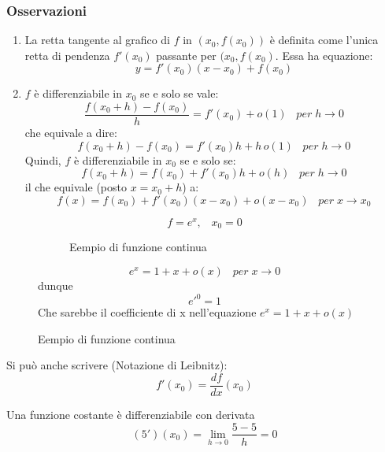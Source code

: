 \documentclass[a4paper]{article}
\theoremstyle{break}
\theoremstyle{break}
\theoremstyle{break}
\theoremstyle{break}
\begin{document}
\subsubsection{Osservazioni}
\begin{enumerate}
  \item La retta tangente al grafico di \( f \) in \( (x_0, f(x_0)) \) è definita
    come l'unica retta di pendenza \( f'(x_0) \) passante per \( (x_0, f(x_0) \).
    Essa ha equazione:
    \[
      y = f'(x_0)(x-x_0) + f(x_0)
    \]
  \item \( f \) è differenziabile in \( x_0 \) se e solo se vale:
    \[
      \frac{f(x_0+h)-f(x_0)}{h}=f'(x_0) + o(1)\;\;\; per\;h \to 0
    \]
    che equivale a dire:
    \[
      f(x_0+h)-f(x_0)=f'(x_0)h+h\,o(1)\;\;\; per\;h \to 0
    \]
    Quindi, \( f \) è differenziabile in \( x_0 \) se e solo se:
    \[
      f(x_0+h)=f(x_0)+f'(x_0)h + o(h) \;\;\; per\;h \to 0
    \]
    il che equivale (posto \( x=x_0+h \)) a:
    \[
      f(x)=f(x_0)+f'(x_0)(x-x_0)+o(x-x_0)\;\;\; per\;x \to x_0
    \]
\end{enumerate}
\begin{figure}[H]
  \begin{example}
    \[
      f=e^x,\;\;\; x_0=0
    \]
    \begin{figure}[H]
      \begin{center}
      \end{center}
      \caption{Eempio di funzione continua}
    \end{figure}
    \[
      e^x = 1 + x + o(x)\;\;\; per\;x \to 0
    \]
    dunque
    \[
      e'^0=1
    \]
    Che sarebbe il coefficiente di x nell'equazione \( e^x=1+x+o(x) \)
  \end{example}
\end{figure}
Si può anche scrivere (Notazione di Leibnitz):
\[
  f'(x_0) = \frac{df}{dx}(x_0)
\]
\begin{example}
  Una funzione costante è differenziabile con derivata
  \[
    (5')(x_0)= \lim_{h \to 0} \frac{5-5}{h} = 0
  \]
\end{example}
\end{document}

